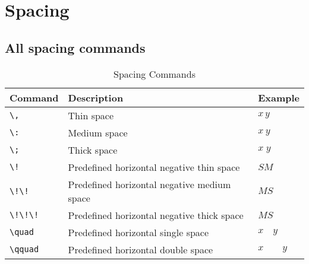 \documentclass[a4paper, 10pt]{report}
\begin{document}
\chapter[Spacing]{Spacing}
\section{All spacing commands}
\begin{table}[h!]
	\begin{tabularx}{15cm}{|X|X|X|}
		\hline
		Command       & Description                                 & Example     \\
		\hline
		\verb|\,|     & Thin space                                  & $x\,y$      \\[3mm]
		\verb|\:|     & Medium space                                & $x\:y$      \\[3mm]
		\verb|\;|     & Thick space                                 & $x\;y$      \\[3mm]
		\verb|\!|     & Predefined horizontal negative thin space   & $S\!M$      \\[3mm]
		\verb|\!\! |  & Predefined horizontal negative medium space & $M\!\!S$    \\[3mm]
		\verb|\!\!\!| & Predefined horizontal negative thick space  & $M\!\!\!S$  \\[3mm]
		\verb|\quad|  & Predefined horizontal single space          & $x\quad y$  \\[3mm]
		\verb|\qquad| & Predefined horizontal double space          & $x\qquad y$ \\[3mm]
		\hline
	\end{tabularx}
	\caption{Spacing Commands}
	\label{table:Spacing_Commands}
\end{table}

\newpage
\end{document}
